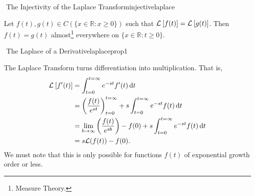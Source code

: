         \begin{theorem}{\Stop\,\,The Injectivity of the Laplace Transform}{injectivelaplace}

            Let \(f(t),g(t)\in C(\{x\in\mathbb{R}:x\geq0\})\) such that \(\mathcal{L}^{}\left[f(t)\right]=\mathcal{L}^{}\left[g(t)\right]\). Then \(f(t)=g(t)\) almost\footnote{Measure Theory.} everywhere on \(\{x\in\mathbb{R}:t\geq0\}\).
            
        \end{theorem}
        \pagebreak
        \begin{theorem}{\Stop\,\,The Laplace of a Derivative}{laplaceprop1}
    
            The Laplace Transform turns differentiation into multiplication. That is, 
            \begin{align*}
                \mathcal{L}^{}\left[f'(t)\right]&=\int_{t=0}^{t=\infty}e^{-st}f'(t)\,\text{d} t \\
                &=\left(\frac{f(t)}{e^{st}}\right)_{t=0}^{t=\infty}+s\int_{t=0}^{t=\infty} e^{-st}f(t) \,\text{d} t  \\
                &=\lim_{b\to\infty}\left(\frac{f(t)}{e^{sb}}\right)-f(0)+s\int_{t=0}^{t=\infty} e^{-st}f(t) \,\text{d} t \\
                &=s\mathcal{L}(f(t))-f(0).
            \end{align*}
            We must note that this is only possible for functions \(f(t)\) of exponential growth order or less.
        
        \end{theorem}